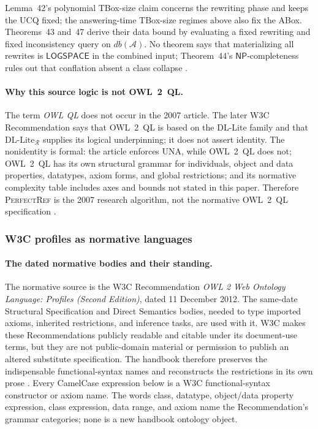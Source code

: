 Lemma~42's polynomial TBox-size claim concerns the rewriting phase and keeps
the UCQ fixed; the answering-time TBox-size regimes above also fix the ABox.
Theorems~43 and~47 derive their data bound by evaluating a fixed rewriting and
fixed inconsistency query on \(db(\mathcal A)\).  No theorem says that
materializing all rewrites is
\(\mathsf{LOGSPACE}\) in the combined input; Theorem~44's
\(\mathsf{NP}\)-completeness rules out that conflation absent a class collapse
\cite[\S\S5.3--7]{CalvaneseEtAl2007}.

\paragraph{Why this source logic is not OWL~2~QL.}
The term \emph{OWL QL} does not occur in the 2007 article.  The later W3C
Recommendation says that OWL~2~QL is based on the DL-Lite family and that
\(\mathrm{DL\mbox{-}Lite}_{\mathcal R}\) supplies its logical underpinning; it
does not assert identity.  The nonidentity is formal: the article enforces UNA,
while OWL~2~QL does not; OWL~2~QL has its own structural grammar for individuals,
object and data properties, datatypes, axiom forms, and global restrictions;
and its normative complexity table includes axes and bounds not stated in this
paper.  Therefore \textsc{PerfectRef} is the 2007 research algorithm, not the
normative OWL~2~QL specification \cite[\S3]{W3COWL2Profiles2012}.

\subsubsection{W3C profiles as normative languages}

\paragraph{The dated normative bodies and their standing.}
The normative source is the W3C Recommendation
\emph{OWL 2 Web Ontology Language: Profiles (Second Edition)}, dated
11 December 2012.
The same-date Structural Specification and Direct Semantics bodies, needed to
type imported axioms, inherited restrictions, and inference tasks, are used
with it.
W3C makes these Recommendations publicly readable and citable under its
document-use terms, but they are not public-domain material or permission to
publish an altered substitute specification.  The handbook therefore preserves
the indispensable functional-syntax names and reconstructs the restrictions in
its own prose
\cite{W3COWL2Profiles2012,W3COWL2Syntax2012,W3COWL2DirectSemantics2012}.
Every CamelCase expression below is a W3C functional-syntax constructor or
axiom name.  The words class, datatype, object/data property expression, class
expression, data range, and axiom name the Recommendation's grammar categories;
none is a new handbook ontology object.

